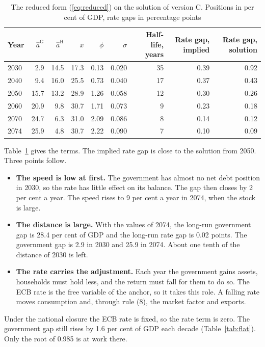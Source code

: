 \documentclass[11pt,a4paper]{article}
\newcommand{\gov}{\mathrm{G}}
\newcommand{\hh}{\mathrm{H}}
\begin{document}
\begin{table}[ht]
\centering
\small
\caption{The reduced form (\ref{eq:reduced}) on the solution of version C. Positions in per cent of GDP, rate gaps in percentage points}
\label{tab:reduced}
\begin{tabular}{@{}lrrrrrrrr@{}}
\toprule
Year & $\hat{a}^{\gov}$ & $\hat{a}^{\hh}$ & $x$ & $\phi$ & $\sigma$ & Half-life, years & Rate gap, implied & Rate gap, solution \\
\midrule
2030 & 2.9 & 14.5 & 17.3 & 0.13 & 0.020 & 35 & 0.39 & 0.92 \\
2040 & 9.4 & 16.0 & 25.5 & 0.73 & 0.040 & 17 & 0.37 & 0.43 \\
2050 & 15.7 & 13.2 & 28.9 & 1.26 & 0.058 & 12 & 0.30 & 0.26 \\
2060 & 20.9 & 9.8 & 30.7 & 1.71 & 0.073 & 9 & 0.23 & 0.18 \\
2070 & 24.7 & 6.3 & 31.0 & 2.09 & 0.086 & 8 & 0.14 & 0.12 \\
2074 & 25.9 & 4.8 & 30.7 & 2.22 & 0.090 & 7 & 0.10 & 0.09 \\
\bottomrule
\end{tabular}
\end{table}

Table~\ref{tab:reduced} gives the terms. The implied rate gap is close to the solution from 2050. Three points follow.
\begin{itemize}
\item \textbf{The speed is low at first.} The government has almost no net debt position in 2030, so the rate has little effect on its balance. The gap then closes by 2 per cent a year. The speed rises to 9 per cent a year in 2074, when the stock is large.
\item \textbf{The distance is large.} With the values of 2074, the long-run government gap is 28.4 per cent of GDP and the long-run rate gap is 0.02 points. The government gap is 2.9 in 2030 and 25.9 in 2074. About one tenth of the distance of 2030 is left.
\item \textbf{The rate carries the adjustment.} Each year the government gains assets, households must hold less, and the return must fall for them to do so. The ECB rate is the free variable of the anchor, so it takes this role. A falling rate moves consumption and, through rule (8), the market factor and exports.
\end{itemize}

Under the national closure the ECB rate is fixed, so the rate term is zero. The government gap still rises by 1.6 per cent of GDP each decade (Table~\ref{tab:flat}). Only the root of 0.985 is at work there.
\end{document}
